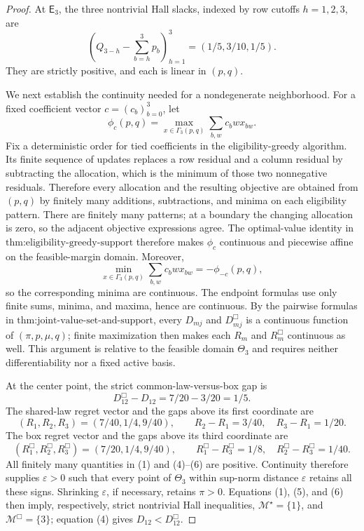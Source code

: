 \documentclass{article}
\begin{document}
\begin{proof}
At \(\mathsf E_3\), the three nontrivial Hall slacks, indexed by row cutoffs \(h=1,2,3\), are
\[
 \left(Q_{3-h}-\sum_{b=h}^3p_b\right)_{h=1}^3
 =(1/5,3/10,1/5).                                         \tag{1}
\]
They are strictly positive, and each is linear in \((p,q)\).

We next establish the continuity needed for a nondegenerate neighborhood.  For a fixed coefficient vector \(c=(c_b)_{b=0}^3\), let
\[
 \phi_c(p,q)=\max_{x\in\Gamma_3(p,q)}\sum_{b,w}c_bwx_{bw}. \tag{2}
\]
Fix a deterministic order for tied coefficients in the eligibility-greedy algorithm.  Its finite sequence of updates replaces a row residual and a column residual by subtracting the allocation, which is the minimum of those two nonnegative residuals.  Therefore every allocation and the resulting objective are obtained from \((p,q)\) by finitely many additions, subtractions, and minima on each eligibility pattern.  There are finitely many patterns; at a boundary the changing allocation is zero, so the adjacent objective expressions agree.  The optimal-value identity in \(\text{thm:eligibility-greedy-support}\) therefore makes \(\phi_c\) continuous and piecewise affine on the feasible-margin domain.  Moreover,
\[
 \min_{x\in\Gamma_3(p,q)}\sum_{b,w}c_bwx_{bw}=-\phi_{-c}(p,q),             \tag{3}
\]
so the corresponding minima are continuous.  The endpoint formulas use only finite sums, minima, and maxima, hence are continuous.  By the pairwise formulas in \(\text{thm:joint-value-set-and-support}\), every \(D_{mj}\) and \(D_{mj}^{\Box}\) is a continuous function of \((\pi,p,\mu,q)\); finite maximization then makes each \(R_m\) and \(R_m^{\Box}\) continuous as well.  This argument is relative to the feasible domain \(\Theta_3\) and requires neither differentiability nor a fixed active basis.

At the center point, the strict common-law-versus-box gap is
\[
 D_{12}^{\Box}-D_{12}=7/20-3/20=1/5.                     \tag{4}
\]
The shared-law regret vector and the gaps above its first coordinate are
\[
 (R_1,R_2,R_3)=(7/40,1/4,9/40),\qquad
 R_2-R_1=3/40,\quad R_3-R_1=1/20.                         \tag{5}
\]
The box regret vector and the gaps above its third coordinate are
\[
 (R_1^{\Box},R_2^{\Box},R_3^{\Box})=(7/20,1/4,9/40),\qquad
 R_1^{\Box}-R_3^{\Box}=1/8,\quad
 R_2^{\Box}-R_3^{\Box}=1/40.                             \tag{6}
\]
All finitely many quantities in (1) and (4)--(6) are positive.  Continuity therefore supplies \(\varepsilon>0\) such that every point of \(\Theta_3\) within sup-norm distance \(\varepsilon\) retains all these signs.  Shrinking \(\varepsilon\), if necessary, retains \(\pi>0\).  Equations (1), (5), and (6) then imply, respectively, strict nontrivial Hall inequalities, \(\mathcal M^\star=\{1\}\), and \(\mathcal M^{\Box}=\{3\}\); equation (4) gives \(D_{12}<D_{12}^{\Box}\).


\end{proof}
\end{document}
